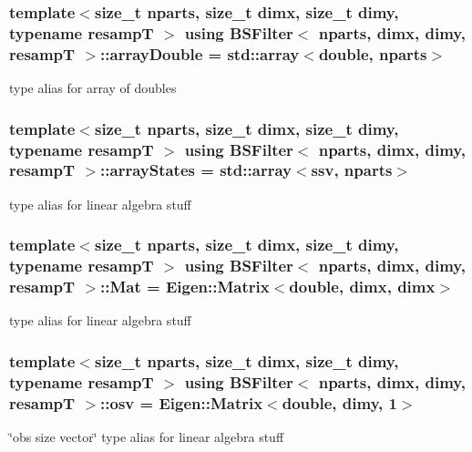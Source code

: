 \subsubsection[{\texorpdfstring{array\+Double}{arrayDouble}}]{\setlength{\rightskip}{0pt plus 5cm}template$<$size\+\_\+t nparts, size\+\_\+t dimx, size\+\_\+t dimy, typename resampT $>$ using {\bf B\+S\+Filter}$<$ nparts, dimx, dimy, resampT $>$\+::{\bf array\+Double} =  std\+::array$<$double, nparts$>$}\hypertarget{classBSFilter_aac1c14ca429c702932574931ee2c6f0e}{}\label{classBSFilter_aac1c14ca429c702932574931ee2c6f0e}
type alias for array of doubles 
\subsubsection[{\texorpdfstring{array\+States}{arrayStates}}]{\setlength{\rightskip}{0pt plus 5cm}template$<$size\+\_\+t nparts, size\+\_\+t dimx, size\+\_\+t dimy, typename resampT $>$ using {\bf B\+S\+Filter}$<$ nparts, dimx, dimy, resampT $>$\+::{\bf array\+States} =  std\+::array$<${\bf ssv}, nparts$>$}\hypertarget{classBSFilter_a39f954add54c601315e1325aba52dd59}{}\label{classBSFilter_a39f954add54c601315e1325aba52dd59}
type alias for linear algebra stuff 
\subsubsection[{\texorpdfstring{Mat}{Mat}}]{\setlength{\rightskip}{0pt plus 5cm}template$<$size\+\_\+t nparts, size\+\_\+t dimx, size\+\_\+t dimy, typename resampT $>$ using {\bf B\+S\+Filter}$<$ nparts, dimx, dimy, resampT $>$\+::{\bf Mat} =  Eigen\+::\+Matrix$<$double, dimx, dimx$>$}\hypertarget{classBSFilter_afdce3784f96aac7305cdeeabaacdf521}{}\label{classBSFilter_afdce3784f96aac7305cdeeabaacdf521}
type alias for linear algebra stuff 
\subsubsection[{\texorpdfstring{osv}{osv}}]{\setlength{\rightskip}{0pt plus 5cm}template$<$size\+\_\+t nparts, size\+\_\+t dimx, size\+\_\+t dimy, typename resampT $>$ using {\bf B\+S\+Filter}$<$ nparts, dimx, dimy, resampT $>$\+::{\bf osv} =  Eigen\+::\+Matrix$<$double, dimy, 1$>$}\hypertarget{classBSFilter_aea27600dd7c5af20fa7a0fc57f18b0a2}{}\label{classBSFilter_aea27600dd7c5af20fa7a0fc57f18b0a2}
\char`\"{}obs size vector\char`\"{} type alias for linear algebra stuff 
